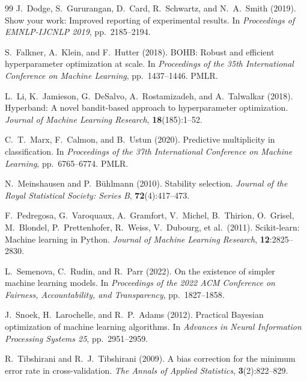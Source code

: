 \documentclass[twoside]{article}
\begin{document}
\begin{thebibliography}{99}
J.~Dodge, S.~Gururangan, D.~Card, R.~Schwartz, and N.~A.~Smith (2019).
\newblock Show your work: Improved reporting of experimental results.
\newblock In \textit{Proceedings of EMNLP-IJCNLP 2019}, pp.~2185--2194.

S.~Falkner, A.~Klein, and F.~Hutter (2018).
\newblock BOHB: Robust and efficient hyperparameter optimization at scale.
\newblock In \textit{Proceedings of the 35th International Conference on
  Machine Learning}, pp.~1437--1446. PMLR.

L.~Li, K.~Jamieson, G.~DeSalvo, A.~Rostamizadeh, and A.~Talwalkar (2018).
\newblock Hyperband: A novel bandit-based approach to hyperparameter
  optimization.
\newblock \textit{Journal of Machine Learning Research}, \textbf{18}(185):1--52.

C.~T.~Marx, F.~Calmon, and B.~Ustun (2020).
\newblock Predictive multiplicity in classification.
\newblock In \textit{Proceedings of the 37th International Conference on
  Machine Learning}, pp.~6765--6774. PMLR.

N.~Meinshausen and P.~B{\"u}hlmann (2010).
\newblock Stability selection.
\newblock \textit{Journal of the Royal Statistical Society: Series B},
  \textbf{72}(4):417--473.

F.~Pedregosa, G.~Varoquaux, A.~Gramfort, V.~Michel, B.~Thirion, O.~Grisel,
  M.~Blondel, P.~Prettenhofer, R.~Weiss, V.~Dubourg, et al.\ (2011).
\newblock Scikit-learn: Machine learning in Python.
\newblock \textit{Journal of Machine Learning Research}, \textbf{12}:2825--2830.

L.~Semenova, C.~Rudin, and R.~Parr (2022).
\newblock On the existence of simpler machine learning models.
\newblock In \textit{Proceedings of the 2022 ACM Conference on Fairness,
  Accountability, and Transparency}, pp.~1827--1858.

J.~Snoek, H.~Larochelle, and R.~P.~Adams (2012).
\newblock Practical Bayesian optimization of machine learning algorithms.
\newblock In \textit{Advances in Neural Information Processing Systems 25},
  pp.~2951--2959.

R.~Tibshirani and R.~J.~Tibshirani (2009).
\newblock A bias correction for the minimum error rate in cross-validation.
\newblock \textit{The Annals of Applied Statistics}, \textbf{3}(2):822--829.

\end{thebibliography}
\end{document}
